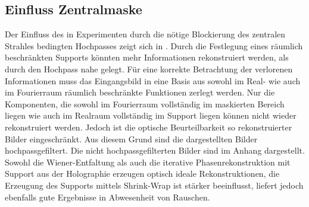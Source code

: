 \subsection{Einfluss Zentralmaske}
Der Einfluss des in Experimenten durch die nötige Blockierung des zentralen Strahles bedingten Hochpasses zeigt sich in . Durch die Festlegung eines räumlich beschränkten Supports könnten mehr Informationen rekonstruiert werden, als durch den Hochpass nahe gelegt. Für eine korrekte Betrachtung der verlorenen Informationen muss das Eingangsbild in eine Basis aus sowohl im Real- wie auch im Fourierraum räumlich beschränkte Funktionen zerlegt werden. Nur die Komponenten, die sowohl im Fourierraum vollständig im maskierten Bereich liegen wie auch im Realraum vollständig im Support liegen können nicht wieder rekonstruiert werden. Jedoch ist die optische Beurteilbarkeit so rekonstruierter Bilder eingeschränkt. Aus diesem Grund sind die dargestellten Bilder hochpassgefiltert. Die nicht hochpassgefilterten Bilder sind im Anhang dargestellt.
Sowohl die Wiener-Entfaltung als auch die iterative Phasenrekonstruktion mit Support aus der Holographie erzeugen optisch ideale Rekonstruktionen, die Erzeugung des Supports mittels Shrink-Wrap ist stärker beeinflusst, liefert jedoch ebenfalls gute Ergebnisse in Abwesenheit von Rauschen.
